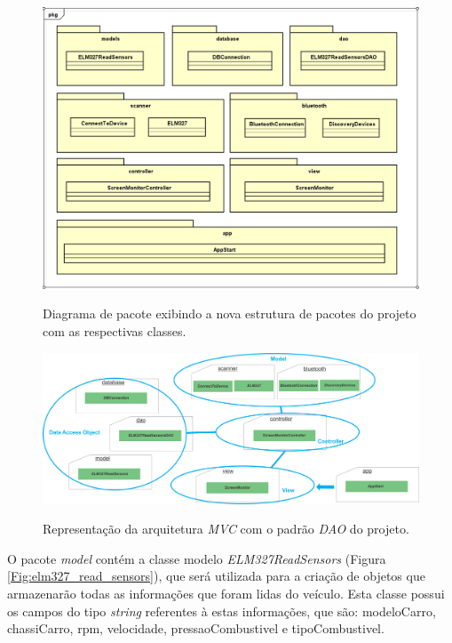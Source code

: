\begin{figure}[!ht]
\centering
\caption{Diagrama de pacote exibindo a nova estrutura de pacotes do projeto com as respectivas classes.} 
{\includegraphics[scale=.44]{imagens/estruturacaoPacotesNovo.png}}\\
 \label{Fig:diagrama_classe_novo}
\end{figure}

\begin{figure}[!ht]
\centering
\caption{Representação da arquitetura \textit{MVC} com o padrão \textit{DAO} do projeto.} 
{\includegraphics[scale=.38]{imagens/diagramaMvcDao.png}}\\
 \label{Fig:diagrama_mvc_dao}
\end{figure}

O pacote \textit{model} contém a classe modelo \textit{ELM327ReadSensors} (Figura \ref{Fig:elm327_read_sensors}), que será utilizada para a criação de objetos que armazenarão todas as informações que foram lidas do veículo. Esta classe possui os campos do tipo \textit{string} referentes à estas informações, que são: modeloCarro, chassiCarro, rpm, velocidade, pressaoCombustivel e tipoCombustivel.

